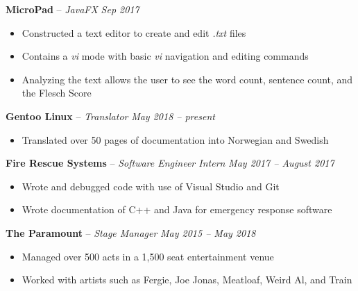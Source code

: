 \documentclass[11pt,letterpaper]{article}
\begin{document}
\headedsection 
{\textbf{MicroPad} -- \textit{JavaFX}}
{\textit{Sep 2017}} {
		\begin{itemize}[noitemsep,nolistsep]
	\item Constructed a text editor to create and edit \textit{.txt} files
	\item Contains a \textit{vi} mode with basic \textit{vi} navigation and editing commands
	\item Analyzing the text allows the user to see the word count, sentence count, and the Flesch Score
\end{itemize}
}


\spacedhrule{0em}{-0.9em} 



\headedsection
{\textbf{Gentoo Linux} -- \textit{Translator}}
{\textit{May 2018 -- present}} {
	\begin{itemize}[noitemsep,nolistsep]
		\item Translated over 50 pages of documentation into Norwegian and Swedish
	\end{itemize}
}


\headedsection 
{\textbf{Fire Rescue Systems} -- \textit{Software Engineer Intern}}
{\textit{May 2017 -- August 2017}} {
	\begin{itemize}[noitemsep,nolistsep]
		\item Wrote and debugged code with use of Visual Studio and Git
		\item Wrote documentation of C++ and Java for emergency response software
	\end{itemize}
}


\headedsection 
{\textbf{The Paramount} -- \textit{Stage Manager}}
{\textit{May 2015 -- May 2018}} {
	\begin{itemize}[noitemsep,nolistsep]
		\item Managed over 500 acts in a 1,500 seat entertainment venue
		\item Worked with artists such as Fergie, Joe Jonas, Meatloaf, Weird Al, and Train
	\end{itemize}
}
\end{document}
